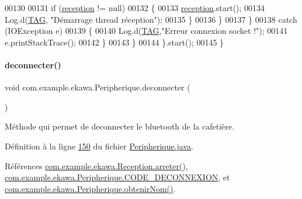\begin{DoxyCode}
00130 
00131                         \textcolor{keywordflow}{if} (\hyperlink{classcom_1_1example_1_1ekawa_1_1_peripherique_a0192ad260e727ed46efa968a79364338}{reception} != null)
00132                         \{
00133                             \hyperlink{classcom_1_1example_1_1ekawa_1_1_peripherique_a0192ad260e727ed46efa968a79364338}{reception}.start();
00134                             Log.d(\hyperlink{classcom_1_1example_1_1ekawa_1_1_peripherique_a80ad0e52c530c7dc114109ff777ae975}{TAG}, \textcolor{stringliteral}{"Démarrage thread réception"});
00135                         \}
00136                     \}
00137                 \}
00138                 \textcolor{keywordflow}{catch} (IOException e)
00139                 \{
00140                     Log.d(\hyperlink{classcom_1_1example_1_1ekawa_1_1_peripherique_a80ad0e52c530c7dc114109ff777ae975}{TAG},\textcolor{stringliteral}{"Erreur connexion socket !"});
00141                     e.printStackTrace();
00142                 \}
00143             \}
00144         \}.start();
00145     \}
\end{DoxyCode}
\mbox{\label{classcom_1_1example_1_1ekawa_1_1_peripherique_aadfd24f4d783a7834c044041c7c035bb}} 
\paragraph{\texorpdfstring{deconnecter()}{deconnecter()}}
{\footnotesize\ttfamily void com.\+example.\+ekawa.\+Peripherique.\+deconnecter (\begin{DoxyParamCaption}{ }\end{DoxyParamCaption})}



Méthode qui permet de deconnecter le bluetooth de la cafetière. 



Définition à la ligne \hyperlink{_peripherique_8java_source_l00150}{150} du fichier \hyperlink{_peripherique_8java_source}{Peripherique.\+java}.



Références \hyperlink{_reception_8java_source_l00088}{com.\+example.\+ekawa.\+Reception.\+arreter()}, \hyperlink{_peripherique_8java_source_l00035}{com.\+example.\+ekawa.\+Peripherique.\+C\+O\+D\+E\+\_\+\+D\+E\+C\+O\+N\+N\+E\+X\+I\+ON}, et \hyperlink{_peripherique_8java_source_l00244}{com.\+example.\+ekawa.\+Peripherique.\+obtenir\+Nom()}.



